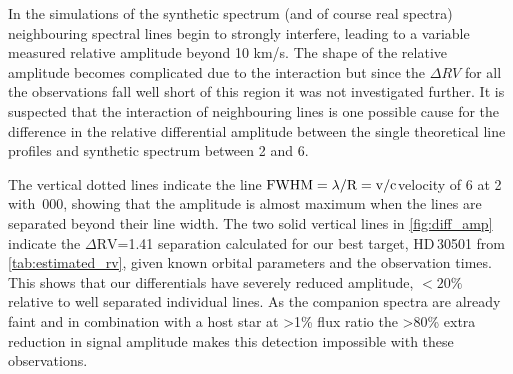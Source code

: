 In the simulations of the synthetic spectrum (and of course real spectra) neighbouring spectral lines begin to strongly interfere, leading to a variable measured relative amplitude beyond 10 km/s.
The shape of the relative amplitude becomes complicated due to the interaction but since the \(\Delta {RV}\) for all the observations fall well short of this region it was not investigated further.
It is suspected that the interaction of neighbouring lines is one possible cause for the difference in the relative differential amplitude between the single theoretical line profiles and synthetic spectrum between 2 and 6\kmps{}.

The vertical dotted lines indicate the line \(\rm {\textrm{FWHM}} = \lambda /\textrm{R}=v /c \)velocity of 6\kmps{} at 2\um{} with \,000, showing that the amplitude is almost maximum when the lines are separated beyond their line width.
The two solid vertical lines in \cref{fig:diff_amp} indicate the \(\Delta \textrm{RV}\)=1.41\kmps{} separation calculated for our best target, {HD\,30501} from \cref{tab:estimated_rv}, given known orbital parameters and the observation times.
This shows that our differentials have severely reduced amplitude, \(<20\%\) relative to well separated individual lines.
As the companion spectra are already faint and in combination with a host star at >1\% flux ratio the >80\% extra reduction in signal amplitude makes this detection impossible with these observations.

